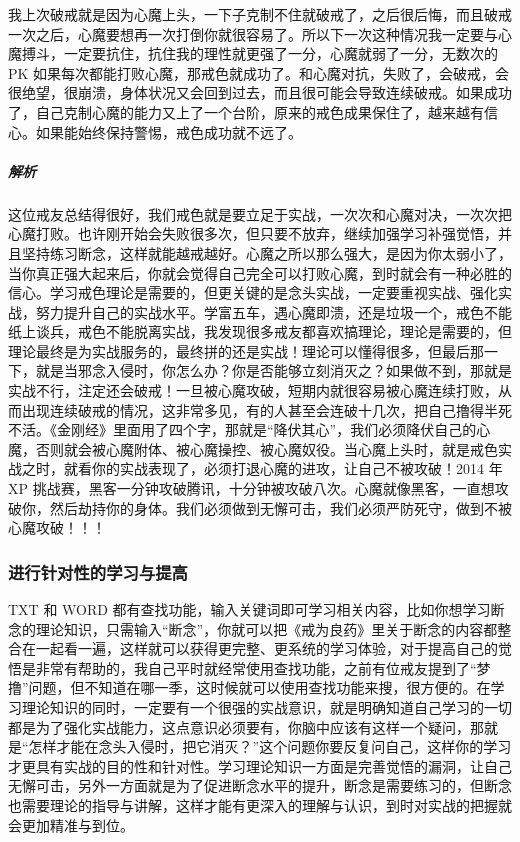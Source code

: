 \begin{case}
    我上次破戒就是因为心魔上头，一下子克制不住就破戒了，之后很后悔，而且破戒一次之后，心魔要想再一次打倒你就很容易了。所以下一次这种情况我一定要与心魔搏斗，一定要抗住，抗住我的理性就更强了一分，心魔就弱了一分，无数次的 PK 如果每次都能打败心魔，那戒色就成功了。和心魔对抗，失败了，会破戒，会很绝望，很崩溃，身体状况又会回到过去，而且很可能会导致连续破戒。如果成功了，自己克制心魔的能力又上了一个台阶，原来的戒色成果保住了，越来越有信心。如果能始终保持警惕，戒色成功就不远了。
    \subparagraph{解析} 这位戒友总结得很好，我们戒色就是要立足于实战，一次次和心魔对决，一次次把心魔打败。也许刚开始会失败很多次，但只要不放弃，继续加强学习补强觉悟，并且坚持练习断念，这样就能越戒越好。心魔之所以那么强大，是因为你太弱小了，当你真正强大起来后，你就会觉得自己完全可以打败心魔，到时就会有一种必胜的信心。学习戒色理论是需要的，但更关键的是念头实战，一定要重视实战、强化实战，努力提升自己的实战水平。学富五车，遇心魔即溃，还是垃圾一个，戒色不能纸上谈兵，戒色不能脱离实战，我发现很多戒友都喜欢搞理论，理论是需要的，但理论最终是为实战服务的，最终拼的还是实战！理论可以懂得很多，但最后那一下，就是当邪念入侵时，你怎么办？你是否能够立刻消灭之？如果做不到，那就是实战不行，注定还会破戒！一旦被心魔攻破，短期内就很容易被心魔连续打败，从而出现连续破戒的情况，这非常多见，有的人甚至会连破十几次，把自己撸得半死不活。《金刚经》里面用了四个字，那就是“降伏其心”，我们必须降伏自己的心魔，否则就会被心魔附体、被心魔操控、被心魔奴役。当心魔上头时，就是戒色实战之时，就看你的实战表现了，必须打退心魔的进攻，让自己不被攻破！2014 年 XP 挑战赛，黑客一分钟攻破腾讯，十分钟被攻破八次。心魔就像黑客，一直想攻破你，然后劫持你的身体。我们必须做到无懈可击，我们必须严防死守，做到不被心魔攻破！！！
\end{case}

\subsubsection{进行针对性的学习与提高}

TXT 和 WORD 都有查找功能，输入关键词即可学习相关内容，比如你想学习断念的理论知识，只需输入“断念”，你就可以把《戒为良药》里关于断念的内容都整合在一起看一遍，这样就可以获得更完整、更系统的学习体验，对于提高自己的觉悟是非常有帮助的，我自己平时就经常使用查找功能，之前有位戒友提到了“梦撸”问题，但不知道在哪一季，这时候就可以使用查找功能来搜，很方便的。在学习理论知识的同时，一定要有一个很强的实战意识，就是明确知道自己学习的一切都是为了强化实战能力，这点意识必须要有，你脑中应该有这样一个疑问，那就是“怎样才能在念头入侵时，把它消灭？”这个问题你要反复问自己，这样你的学习才更具有实战的目的性和针对性。学习理论知识一方面是完善觉悟的漏洞，让自己无懈可击，另外一方面就是为了促进断念水平的提升，断念是需要练习的，但断念也需要理论的指导与讲解，这样才能有更深入的理解与认识，到时对实战的把握就会更加精准与到位。

